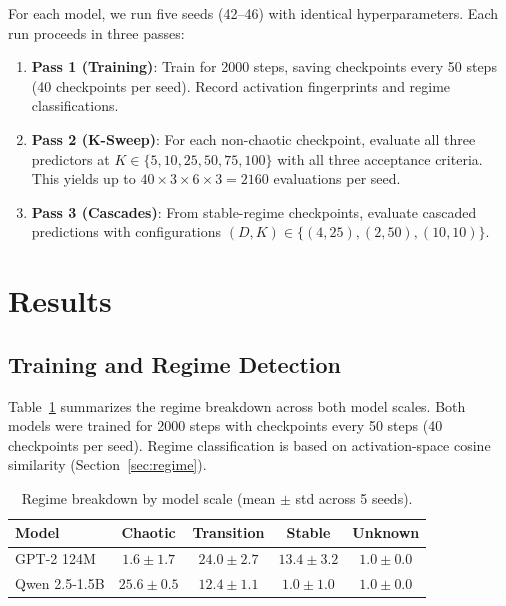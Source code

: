 \documentclass{article}
\begin{document}
For each model, we run five seeds (42--46) with identical hyperparameters.
Each run proceeds in three passes:
\begin{enumerate}
    \item \textbf{Pass 1 (Training)}: Train for 2000 steps, saving checkpoints every 50 steps (40 checkpoints per seed). Record activation fingerprints and regime classifications.
    \item \textbf{Pass 2 (K-Sweep)}: For each non-chaotic checkpoint, evaluate all three predictors at $K \in \{5, 10, 25, 50, 75, 100\}$ with all three acceptance criteria. This yields up to $40 \times 3 \times 6 \times 3 = 2160$ evaluations per seed.
    \item \textbf{Pass 3 (Cascades)}: From stable-regime checkpoints, evaluate cascaded predictions with configurations $(D, K) \in \{(4, 25), (2, 50), (10, 10)\}$.
\end{enumerate}

\section{Results}
\label{sec:results}

\subsection{Training and Regime Detection}
\label{sec:results:regimes}

Table~\ref{tab:regimes} summarizes the regime breakdown across both model scales.
Both models were trained for 2000 steps with checkpoints every 50 steps (40 checkpoints per seed).
Regime classification is based on activation-space cosine similarity (Section~\ref{sec:regime}).

\begin{table}[h]
\centering
\caption{Regime breakdown by model scale (mean $\pm$ std across 5 seeds).
}
\label{tab:regimes}
\begin{tabular}{lcccc}
\toprule
\textbf{Model} & \textbf{Chaotic} & \textbf{Transition} & \textbf{Stable} & \textbf{Unknown} \\
\midrule
GPT-2 124M     & $1.6 \pm 1.7$ & $24.0 \pm 2.7$ & $13.4 \pm 3.2$ & $1.0 \pm 0.0$ \\
Qwen 2.5-1.5B  & $25.6 \pm 0.5$ & $12.4 \pm 1.1$ & $1.0 \pm 1.0$ & $1.0 \pm 0.0$ \\
\bottomrule
\end{tabular}
\end{table}
\end{document}
